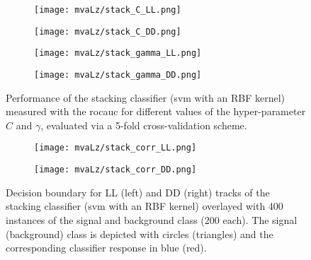 \begin{figure}[htbp]
    \centering
    \begin{subfigure}[b]{.49\textwidth}
        \centering
        \texttt{[image: mvaLz/stack\_C\_LL.png]}
    \end{subfigure}
    \begin{subfigure}[b]{.49\textwidth}
        \centering
        \texttt{[image: mvaLz/stack\_C\_DD.png]}
    \end{subfigure}
    \par\bigskip 
    \begin{subfigure}[b]{.49\textwidth}
        \centering
        \texttt{[image: mvaLz/stack\_gamma\_LL.png]}
    \end{subfigure}
    \begin{subfigure}[b]{.49\textwidth}
        \centering
        \texttt{[image: mvaLz/stack\_gamma\_DD.png]}
    \end{subfigure}
    \caption{Performance of the stacking classifier (\gls{svm} with an RBF kernel) measured with the \gls{rocauc} for different values of the hyper-parameter $C$ and $\gamma$, evaluated via a 5-fold cross-validation scheme.}
    \label{fig:mvaLz_stack_hyperparams}
\end{figure}

\begin{figure}[htbp]
    \centering
    \begin{subfigure}[b]{.49\textwidth}
        \centering
        \texttt{[image: mvaLz/stack\_corr\_LL.png]}
    \end{subfigure}
    \begin{subfigure}[b]{.49\textwidth}
        \centering
        \texttt{[image: mvaLz/stack\_corr\_DD.png]}
    \end{subfigure}
    \caption{Decision boundary for \gls{LL} (left) and \gls{DD} (right) tracks of the stacking classifier (\gls{svm} with an RBF kernel) overlayed with 400 instances of the signal and background class (200 each). The signal (background) class is depicted with circles (triangles) and the corresponding classifier response in blue (red).}
    \label{fig:mvaLz_decboundary}
\end{figure}

